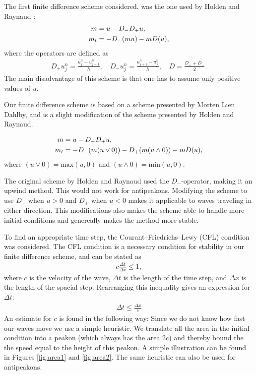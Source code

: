 The first finite difference scheme considered, was the one used by Holden and Raynaud \cite{holden2006convergence}:
\begin{align}
m &= u - D_{-}D_{+}u, \notag \\ 
m_t &= -D_{-}(mu) - mD(u),
\label{eq:discretized}
\end{align}
where the operators are defined as
\begin{align}
\label{eq:operators}
D_{+}u_{j}^{n} = \frac{u_{j}^{n}-u_{j-1}^{n}}{h},\quad
D_{-}u_{j}^{n} = \frac{u_{j+1}^{n}-u_{j}^{n}}{h},\quad
D = \frac{D_{+}+D_{-}}{2}.
\end{align}
The main disadvantage of this scheme is that one has to assume only positive values of $u$.

Our finite difference scheme is based on a scheme presented by Morten Lien Dahlby\cite{dahlby2007geometric}, and is a slight modification of the scheme presented by Holden and Raynaud.

\begin{align}
m &= u - D_{-}D_{+}u, \notag \\ 
m_t &= -D_{-}(m(u \vee 0)) -D_{+}(m(u \wedge 0)) - mD(u), 
\label{eq:modscheme}
\end{align}
where $(u \vee 0) = \text{max}(u,0)$ and $(u \wedge 0) = \text{min}(u,0)$.

The original scheme by Holden and Raynaud used the $D_{-}$-operator, making it an upwind method. This would not work for antipeakons. Modifying the scheme to use  $D_{-}$ when $u > 0$ and $D_{+}$ when $ u < 0$ makes it applicable to waves traveling in either direction. This modifications also makes the scheme able to handle more initial conditions and genereally makes the method more stable. 

To find an appropriate time step, the Courant–Friedrichs–Lewy (CFL) condition was considered. The CFL condition is a necessary condition for stability in our finite difference scheme, and can be stated as
\begin{align*}
c\frac{\Delta t}{\Delta x} \leq 1,
\end{align*}
where $c$ is the velocity of the wave, $\Delta t$ is the length of the time step, and $\Delta x$ is the length of the spacial step. Rearranging this inequality gives an expression for $\Delta t$:
\begin{align*}
\Delta t \leq \frac{\Delta x}{c}
\end{align*}
An estimate for $c$ is found in the following way: Since we do not know how fast our waves move we use a simple heuristic. We translate all the area in the initial condition into a peakon (which always has the area $2c$) and thereby bound the the speed equal to the height of this peakon. A simple illustration can be found in Figures \ref{fig:area1} and \ref{fig:area2}. The same heuristic can also be used for antipeakons.


